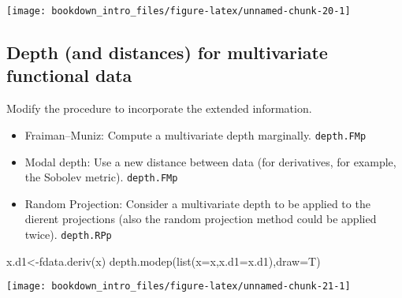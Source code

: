 \documentclass[
]{book}
\newenvironment{Shaded}{\begin{snugshade}}{\end{snugshade}}
\newcommand{\AttributeTok}[1]{\textcolor[rgb]{0.77,0.63,0.00}{#1}}
\newcommand{\ConstantTok}[1]{\textcolor[rgb]{0.00,0.00,0.00}{#1}}
\newcommand{\FunctionTok}[1]{\textcolor[rgb]{0.00,0.00,0.00}{#1}}
\newcommand{\NormalTok}[1]{#1}
\newcommand{\OtherTok}[1]{\textcolor[rgb]{0.56,0.35,0.01}{#1}}
\newcommand{\SpecialCharTok}[1]{\textcolor[rgb]{0.00,0.00,0.00}{#1}}
\providecommand{\tightlist}{%
  \setlength{\itemsep}{0pt}\setlength{\parskip}{0pt}}
\begin{document}
\begin{Shaded}
\end{Shaded}

\begin{center}\texttt{[image: bookdown\_intro\_files/figure-latex/unnamed-chunk-20-1]} \end{center}

\hypertarget{depth-and-distances-for-multivariate-functional-data-cuesta2017}{%
\subsection{\texorpdfstring{Depth (and distances) for multivariate functional data \citep{cuesta2017}}{Depth (and distances) for multivariate functional data {[}@cuesta2017{]}}}\label{depth-and-distances-for-multivariate-functional-data-cuesta2017}}

Modify the procedure to incorporate the extended information.

\begin{itemize}
\tightlist
\item
  Fraiman--Muniz: Compute a multivariate depth marginally. \texttt{depth.FMp}
\item
  Modal depth: Use a new distance between data (for derivatives, for example, the Sobolev metric). \texttt{depth.FMp}
\item
  Random Projection: Consider a multivariate depth to be applied to the dierent projections (also the random projection method could be applied twice). \texttt{depth.RPp}
\end{itemize}

\begin{Shaded}
\begin{Highlighting}[]
\NormalTok{x.d1}\OtherTok{\textless{}{-}}\FunctionTok{fdata.deriv}\NormalTok{(x)}
\FunctionTok{depth.modep}\NormalTok{(}\FunctionTok{list}\NormalTok{(}\AttributeTok{x=}\NormalTok{x,}\AttributeTok{x.d1=}\NormalTok{x.d1),}\AttributeTok{draw=}\NormalTok{T)}
\end{Highlighting}
\end{Shaded}

\begin{center}\texttt{[image: bookdown\_intro\_files/figure-latex/unnamed-chunk-21-1]} \end{center}
\end{document}
